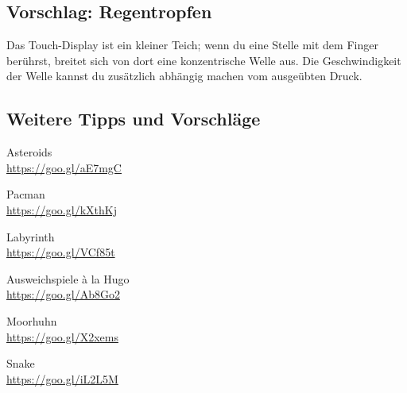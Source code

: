 \subsection*{Vorschlag: Regentropfen}

Das Touch-Display ist ein kleiner Teich;
wenn du eine Stelle mit dem Finger berührst, breitet sich von dort eine konzentrische Welle aus.
Die Geschwindigkeit der Welle kannst du zusätzlich abhängig machen vom ausgeübten Druck.


\subsection*{Weitere Tipps und Vorschläge}
\begin{minipage}{.45\textwidth}
    \begin{center}Asteroids\\
        \href{https://goo.gl/aE7mgC}{https://goo.gl/aE7mgC}
    \end{center}
    \vspace{2ex}
    \begin{center}Pacman\\
        \href{https://goo.gl/kXthKj}{https://goo.gl/kXthKj}
    \end{center}
    \vspace{2ex}
    \begin{center}Labyrinth\\
        \href{https://goo.gl/VCf85t}{https://goo.gl/VCf85t}
    \end{center}
\end{minipage}
\begin{minipage}{.45\textwidth}
	\begin{center}Ausweichspiele à la Hugo\\
        \href{https://goo.gl/Ab8Go2}{https://goo.gl/Ab8Go2}
    \end{center}
    \vspace{2ex}
	\begin{center}Moorhuhn\\
        \href{https://goo.gl/X2xems}{https://goo.gl/X2xems}
    \end{center}
    \vspace{2ex}
	\begin{center}Snake\\
       \href{https://goo.gl/iL2L5M}{https://goo.gl/iL2L5M}
    \end{center}
\end{minipage}

